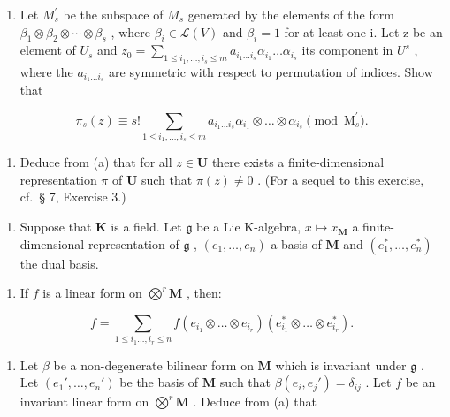 \begin{enumerate}
\def\labelenumi{(\alph{enumi})}
\tightlist
\item
  Let \(M_{s}^{\prime}\) be the subspace of \(M_{s}\) generated by the elements of the form \(\beta_{1} \otimes \beta_{2} \otimes \cdots \otimes \beta_{s}\) , where \(\beta_{i} \in \mathcal{L}(V)\) and \(\beta_{i} = 1\) for at least one i. Let z be an element of \(U_{s}\) and \(z_{0} = \sum_{1 \leqslant i_{1}, \ldots, i_{s} \leqslant m} a_{i_{1} \ldots i_{s}} \alpha_{i_{1}} \ldots \alpha_{i_{s}}\) its component in \(U^{s}\) , where the \(a_{i_{1} \ldots i_{s}}\) are symmetric with respect to permutation of indices. Show that
\end{enumerate}

\[
\pi_ {s} (z) \equiv s! \sum_ {1 \leqslant i _ {1}, \dots , i _ {s} \leqslant m} a _ {i _ {1} \dots i _ {s}} \alpha_ {i _ {1}} \otimes \dots \otimes \alpha_ {i _ {s}} \pmod {\mathrm{M} _ {s} ^ {\prime}}.
\]

\begin{enumerate}
\def\labelenumi{(\alph{enumi})}
\setcounter{enumi}{1}
\tightlist
\item
  Deduce from (a) that for all \(z \in \mathbf{U}\) there exists a finite-dimensional representation \(\pi\) of \(\mathbf{U}\) such that \(\pi(z) \neq 0\) . (For a sequel to this exercise, cf.~§ 7, Exercise 3.)
\end{enumerate}

\begin{enumerate}
\def\labelenumi{\arabic{enumi}.}
\setcounter{enumi}{5}
\tightlist
\item
  Suppose that \(\mathbf{K}\) is a field. Let \(\mathfrak{g}\) be a Lie K-algebra, \(x \mapsto x_{\mathbf{M}}\) a finite-dimensional representation of \(\mathfrak{g}\) , \((e_1, \ldots, e_n)\) a basis of \(\mathbf{M}\) and \((e_1^*, \ldots, e_n^*)\) the dual basis.
\end{enumerate}

\begin{enumerate}
\def\labelenumi{(\alph{enumi})}
\tightlist
\item
  If \(f\) is a linear form on \(\bigotimes^{r} \mathbf{M}\) , then:
\end{enumerate}

\[
f = \sum_ {1 \leqslant i _ {1} \dots , i _ {r} \leqslant n} f (e _ {i _ {1}} \otimes \dots \otimes e _ {i _ {r}}) (e _ {i _ {1}} ^ {*} \otimes \dots \otimes e _ {i _ {r}} ^ {*}).
\]

\begin{enumerate}
\def\labelenumi{(\alph{enumi})}
\setcounter{enumi}{1}
\tightlist
\item
  Let \(\beta\) be a non-degenerate bilinear form on \(\mathbf{M}\) which is invariant under \(\mathfrak{g}\) . Let \((e_1', \ldots, e_n')\) be the basis of \(\mathbf{M}\) such that \(\beta(e_i, e_j') = \delta_{ij}\) . Let \(f\) be an invariant linear form on \(\bigotimes^r \mathbf{M}\) . Deduce from (a) that
\end{enumerate}

